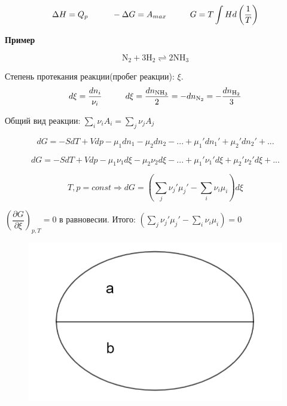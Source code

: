\begin{lecture}
	\begin{equation}	
	\begin{aligned}
	\Delta H = Q_p \hspace*{1cm} -\Delta G = A_{max} \hspace*{1cm} G = T \int H d \left( \frac{1}{T}\right)
	\end{aligned}
	\end{equation}
	
	\begin{center}
		\textbf{Пример}\\
	\end{center}
	\begin{equation}
		\mathrm{N_2 + 3H_2 \rightleftharpoons  2NH_3}
	\end{equation}
	
	Степень протекания реакции(пробег реакции): $\xi$.
	\begin{equation}	
	\begin{aligned}
	d \xi = \frac{dn_i}{\nu_i} \hspace*{1cm} d\xi = \frac{dn_{\mathrm{NH_3}}}{2} = -dn_{\mathrm{N_2}} = -\frac{dn_{\mathrm{H_2}}}{3}
	\end{aligned}
	\end{equation}	
	
	Общий вид реакции: $\sum\limits_{i} \nu_i A_i = \sum\limits_{j} \nu_j A_j$
	
	\begin{equation}
	dG = -SdT + Vdp - \mu_1dn_1 - \mu_2dn_2 - ... + \mu_1'dn_1' + \mu_2'dn_2' + ...  
	\end{equation}
	
	\begin{equation}
	dG = -SdT + Vdp - \mu_1\nu_1d\xi - \mu_2\nu_2d\xi - ... + \mu_1'\nu_1'd\xi + \mu_2'\nu_2'd\xi + ...
	\end{equation}

	\begin{equation}
	T,p = const \Rightarrow dG = (\sum\limits_{j} \nu_j'\mu_j' - \sum\limits_{i} \nu_i\mu_i) d \xi
	\end{equation}
	\par $\left( \dfrac{\partial G}{\partial \xi} \right)_{p,T} = 0$ в равновесии. Итого: $(\sum\limits_{j} \nu_j'\mu_j' - \sum\limits_{i} \nu_i\mu_i) = 0$
	\begin{figure}
		\includegraphics[width=\linewidth]{lecture_02/pic2}
	\end{figure}
	

\end{lecture}
